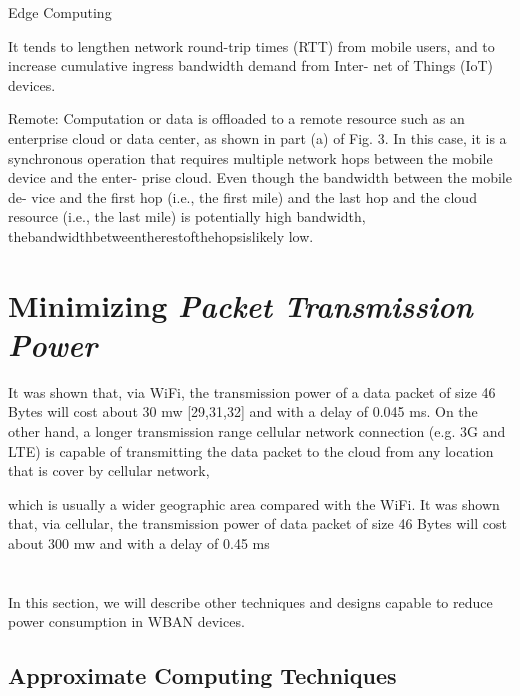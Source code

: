 \documentclass[sigchi]{acmart}
\begin{document}
Edge Computing 

It tends to lengthen
network round-trip times (RTT) from mobile users, and to
increase cumulative ingress bandwidth demand from Inter-
net of Things (IoT) devices.

Remote: Computation or data is oﬄoaded to a remote resource
such as an enterprise cloud or data center, as shown in part (a)
of Fig. 3. In this case, it is a synchronous operation that requires
multiple network hops between the mobile device and the enter-
prise cloud. Even though the bandwidth between the mobile de-
vice and the ﬁrst hop (i.e., the ﬁrst mile) and the last hop and the
cloud resource (i.e., the last mile) is potentially high bandwidth,
thebandwidthbetweentherestofthehopsislikely low.


\citet{MSAReport} 












\section{Minimizing \textit{Packet Transmission Power}}


It was shown that, via WiFi, the transmission power of a data packet of size 46 Bytes will cost about
30 mw [29,31,32] and with a delay of 0.045 ms. On the other hand, a longer transmission range cellular network connection
(e.g. 3G and LTE) is capable of transmitting the data packet to the cloud from any location that is cover by cellular network,

which is usually a wider geographic area compared with the WiFi. It was shown that, via cellular, the transmission power of
data packet of size 46 Bytes will cost about 300 mw and with a delay of 0.45 ms

\section{}

In this section, we will describe other techniques and designs capable to reduce power consumption in WBAN devices.

\subsection{Approximate Computing Techniques}
\end{document}
